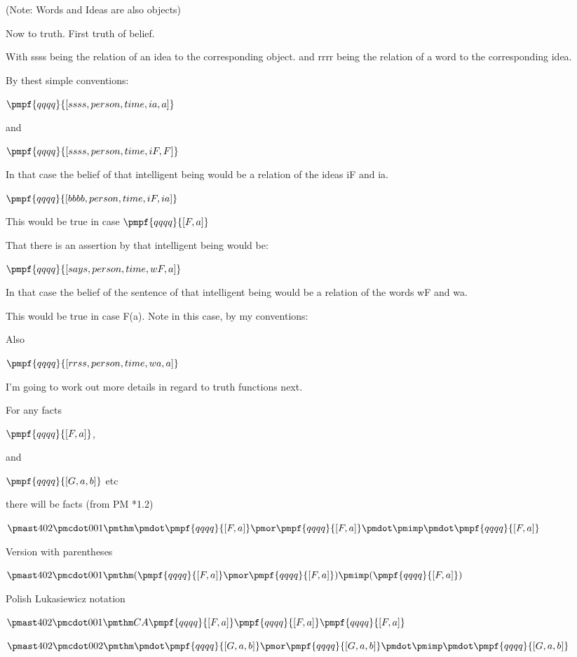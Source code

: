 \documentclass[12pt]{article}
\begin{document}
(Note: Words and Ideas are also objects)

Now to truth. First truth of belief.

With ssss being the relation of an idea to the corresponding object.
and rrrr being the relation of a word to the corresponding idea.

By thest simple conventions:

$\pmpf{qqqq}{[ssss, person, time, ia, a]}$

and

$\pmpf{qqqq}{[ssss, person, time, iF , F]} $

In that case the belief of that intelligent being would be a relation
of the ideas iF and ia.

$\pmpf{qqqq}{[bbbb, person, time, iF, ia]} $

This would be true in case $\pmpf{qqqq}{[F,a]}$

That there is an assertion by that intelligent being would be:

$\pmpf{qqqq}{[says, person, time, wF, a]}$

In that case the belief of the sentence of that intelligent being would
be a relation of the words wF and wa.

This would be true in case F(a).
Note in this case, by my conventions:

Also

$\pmpf{qqqq}{[rrss, person, time, wa, a]}$

I'm going to work out more details in regard to truth functions next.

For any facts 

$\pmpf{qqqq}{[F,a]}$,

and

$\pmpf{qqqq}{[G, a, b]}$
etc

there will be facts (from PM *1.2)

$\pmast 402 \pmcdot 001 \pmthm \pmdot \pmpf{qqqq}{[F,a]} \pmor \pmpf{qqqq}{[F,a]} \pmdot \pmimp \pmdot \pmpf{qqqq}{[F,a]}$
 
 

Version with parentheses

$\pmast 402 \pmcdot 001 \pmthm  (  \pmpf{qqqq}{[F,a]} \pmor \pmpf{qqqq}{[F,a]}  ) \pmimp (  \pmpf{qqqq}{[F,a]})$


Polish Lukasiewicz notation

$\pmast 402 \pmcdot 001 \pmthm  C    A   \pmpf{qqqq}{[F,a]}   \pmpf{qqqq}{[F,a]}    \pmpf{qqqq}{[F,a]} $


$\pmast 402 \pmcdot 002 \pmthm \pmdot \pmpf {qqqq}{[G,a,b]} \pmor \pmpf{qqqq}{[G,a,b]} \pmdot \pmimp \pmdot \pmpf{qqqq}{[G,a,b]}$     
 
\end{document}
